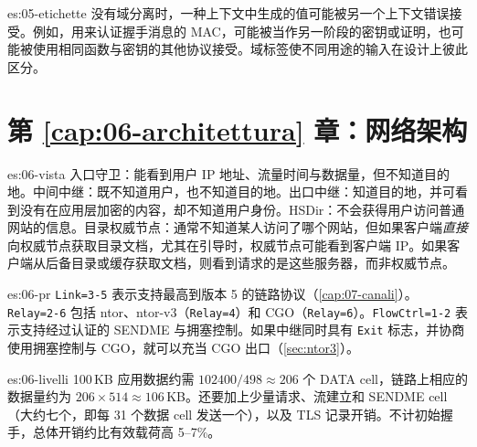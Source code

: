 \begin{soluzione}{es:05-etichette}
没有域分离时，一种上下文中生成的值可能被另一个上下文错误接受。例如，用来认证握手消息的 MAC，可能被当作另一阶段的密钥或证明，也可能被使用相同函数与密钥的其他协议接受。域标签使不同用途的输入在设计上彼此区分。
\end{soluzione}

\section*{第 \ref{cap:06-architettura} 章：网络架构}

\begin{soluzione}{es:06-vista}
入口守卫：能看到用户 IP 地址、流量时间与数据量，但不知道目的地。中间中继：既不知道用户，也不知道目的地。出口中继：知道目的地，并可看到没有在应用层加密的内容，却不知道用户身份。HSDir：不会获得用户访问普通网站的信息。目录权威节点：通常不知道某人访问了哪个网站，但如果客户端\emph{直接}向权威节点获取目录文档，尤其在引导时，权威节点可能看到客户端 IP。如果客户端从后备目录或缓存获取文档，则看到请求的是这些服务器，而非权威节点。
\end{soluzione}

\begin{soluzione}{es:06-pr}
\texttt{Link=3-5} 表示支持最高到版本 5 的链路协议（\cref{cap:07-canali}）。\texttt{Relay=2-6} 包括 ntor、ntor-v3（\texttt{Relay=4}）和 CGO（\texttt{Relay=6}）。\texttt{FlowCtrl=1-2} 表示支持经过认证的 SENDME 与拥塞控制。如果中继同时具有 \texttt{Exit} 标志，并协商使用拥塞控制与 CGO，就可以充当 CGO 出口（\cref{sec:ntor3}）。
\end{soluzione}

\begin{soluzione}{es:06-livelli}
100\,KB 应用数据约需 $102400/498 \approx 206$ 个 DATA cell，链路上相应的数据量约为 $206 \times 514 \approx 106$\,KB。还要加上少量请求、流建立和 SENDME cell（大约七个，即每 31 个数据 cell 发送一个），以及 TLS 记录开销。不计初始握手，总体开销约比有效载荷高 5--7\%。
\end{soluzione}
